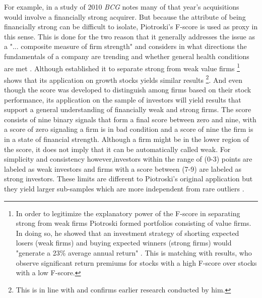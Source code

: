\documentclass[12pt]{article}
\begin{document}
For example, in a study of 2010 \emph{BCG} notes many of that year's acquisitions would involve a financially strong acquirer. But because the attribute of being financially strong can be difficult to isolate, Piotroski's F-score is used as proxy in this sense. This is done for the two reason that it generally addresses the issue as a "... composite measure of firm strength" \citep[p. 496]{Fama2006} and considers in what directions the fundamentals of a company are trending and whether general health conditions are met \citep[p.5]{Mohr2012}. Although \citet{Piotroski2000} established it to separate strong from weak value firms
	\footnote{In order to legitimize the explanatory power of the F-score in separating strong from weak firms Piotroski formed portfolios consisting of value firms. In doing so, he showed that an investment strategy of shorting expected losers (weak firms) and buying expected winners (strong firms) would "generate a 23\% average annual return" \citep[p. 4]{Piotroski2000}. This is matching with \citet{Hyde2014} results, who observe significant return premiums for stocks with a high F-score over stocks with a low F-score.}
\citet{Mohr2012} shows that its application on growth stocks yields similar results
	\footnote{This is in line with \citet{Piotroski2000} and confirms earlier research conducted by him.}.
And even though the score was developed to distinguish among firms based on their stock performance, its application on the sample of investors will yield results that support a general understanding of financially weak and strong firms. The score consists of nine binary signals that form a final score between zero and nine, with a score of zero signaling a firm is in bad condition and a score of nine the firm is in a state of financial strength. 
Although a firm might be in the lower region of the score, it does not imply that it can be automatically called weak. For simplicity and consistency however,investors within the range of (0-3) points are labeled as weak investors and firms with a score between (7-9) are labeled as strong investors. These limits are different to Piotroski's original application but they yield larger sub-samples which are more independent from rare outliers \citep[p.12]{Mohr2012}. 
\end{document}
